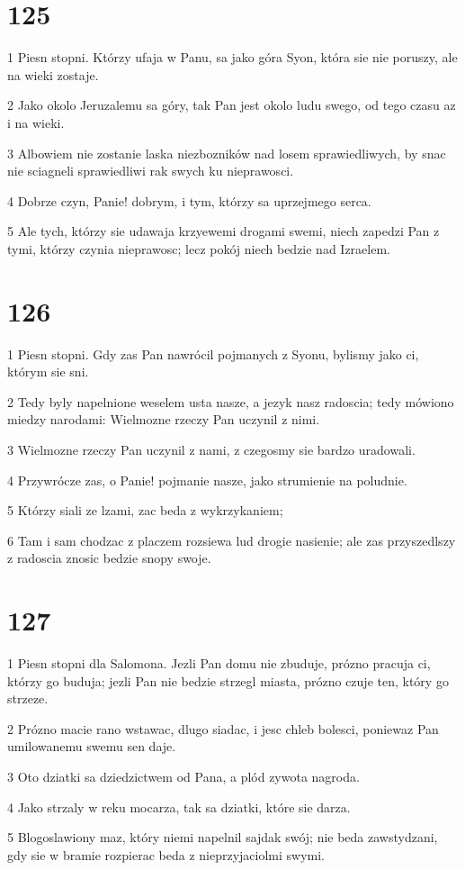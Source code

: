 \chapter{125}

\par 1 Piesn stopni. Którzy ufaja w Panu, sa jako góra Syon, która sie nie poruszy, ale na wieki zostaje.
\par 2 Jako okolo Jeruzalemu sa góry, tak Pan jest okolo ludu swego, od tego czasu az i na wieki.
\par 3 Albowiem nie zostanie laska niezbozników nad losem sprawiedliwych, by snac nie sciagneli sprawiedliwi rak swych ku nieprawosci.
\par 4 Dobrze czyn, Panie! dobrym, i tym, którzy sa uprzejmego serca.
\par 5 Ale tych, którzy sie udawaja krzyewemi drogami swemi, niech zapedzi Pan z tymi, którzy czynia nieprawosc; lecz pokój niech bedzie nad Izraelem.

\chapter{126}

\par 1 Piesn stopni. Gdy zas Pan nawrócil pojmanych z Syonu, bylismy jako ci, którym sie sni.
\par 2 Tedy byly napelnione weselem usta nasze, a jezyk nasz radoscia; tedy mówiono miedzy narodami: Wielmozne rzeczy Pan uczynil z nimi.
\par 3 Wielmozne rzeczy Pan uczynil z nami, z czegosmy sie bardzo uradowali.
\par 4 Przywrócze zas, o Panie! pojmanie nasze, jako strumienie na poludnie.
\par 5 Którzy siali ze lzami, zac beda z wykrzykaniem;
\par 6 Tam i sam chodzac z placzem rozsiewa lud drogie nasienie; ale zas przyszedlszy z radoscia znosic bedzie snopy swoje.

\chapter{127}

\par 1 Piesn stopni dla Salomona. Jezli Pan domu nie zbuduje, prózno pracuja ci, którzy go buduja; jezli Pan nie bedzie strzegl miasta, prózno czuje ten, który go strzeze.
\par 2 Prózno macie rano wstawac, dlugo siadac, i jesc chleb bolesci, poniewaz Pan umilowanemu swemu sen daje.
\par 3 Oto dziatki sa dziedzictwem od Pana, a plód zywota nagroda.
\par 4 Jako strzaly w reku mocarza, tak sa dziatki, które sie darza.
\par 5 Blogoslawiony maz, który niemi napelnil sajdak swój; nie beda zawstydzani, gdy sie w bramie rozpierac beda z nieprzyjaciolmi swymi.

